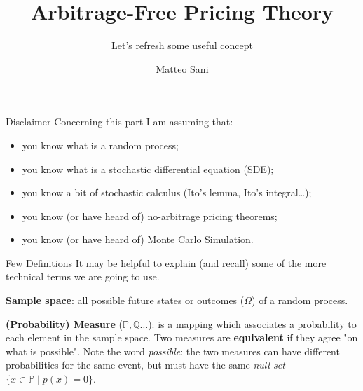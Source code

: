 \documentclass{beamer}
\title{Arbitrage-Free Pricing Theory}
\subtitle{Let's refresh some useful concept}
\author{\href{mailto:matteo.sani@unisi.it}{Matteo Sani}}
\begin{document}
	\begin{frame}[plain]
		\maketitle
	\end{frame}        

\begin{frame}{}
\begin{block}{Disclaimer}	
Concerning this part I am assuming that:
\begin{itemize}
\item you know what is a random process;
\item you know what is a stochastic differential equation (SDE);
\item you know a bit of stochastic calculus (Ito's lemma, Ito's integral\ldots);
\item you know (or have heard of) no-arbitrage pricing theorems;
\item you know (or have heard of) Monte Carlo Simulation.
\end{itemize}
\end{block}
\end{frame}	

\begin{frame}{Few Definitions}
		It may be helpful to explain (and recall) some of the more technical terms we are going to use.\newline
		
		\textbf{Sample space}: all possible future states or outcomes ($\Omega$) of a random process.\newline
		
		\textbf{(Probability) Measure} ($\mathbb{P}, \mathbb{Q}\ldots$): is a mapping which associates a probability to each element in the sample space. Two measures are \textbf{equivalent} if they agree "on what is possible". Note the word \emph{possible}: the two measures can have different probabilities for the same event, but must have the same \emph{null-set} $\{x\in {\mathbb{P}}\mid p (x)=0\}$. 
	\end{frame}
\end{document}

